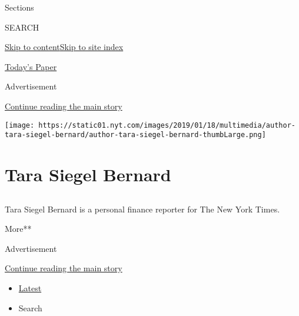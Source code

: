 Sections

SEARCH

\protect\hyperlink{site-content}{Skip to
content}\protect\hyperlink{site-index}{Skip to site index}

\href{https://myaccount.nytimes.com/auth/login?response_type=cookie\&client_id=vi}{}

\href{https://www.nytimes.com/section/todayspaper}{Today's Paper}

Advertisement

\protect\hyperlink{after-top}{Continue reading the main story}

\texttt{[image: https://static01.nyt.com/images/2019/01/18/multimedia/author-tara-siegel-bernard/author-tara-siegel-bernard-thumbLarge.png]}

\hypertarget{tara-siegel-bernard}{%
\section{Tara Siegel Bernard}\label{tara-siegel-bernard}}

\subsection{}

Tara Siegel Bernard is a personal finance reporter for The New York
Times.

More**

Advertisement

\protect\hyperlink{after-mid1}{Continue reading the main story}

\begin{itemize}
\tightlist
\item
  \protect\hyperlink{stream-panel}{Latest}
\item
  Search
\end{itemize}

